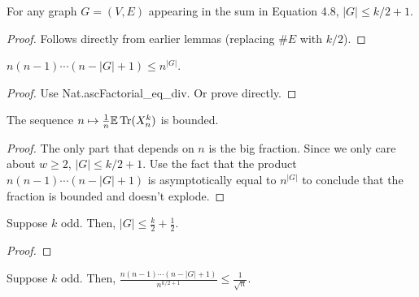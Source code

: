 \begin{lemma}
  \label{lemma:vertex_bound}
  \notready
  For any graph $G = (V, E)$ appearing in the sum in Equation 4.8, $|G| \le k/2 + 1$.
\end{lemma}

\begin{proof}
  \notready
  Follows directly from earlier lemmas (replacing $\#E$ with $k/2$).
\end{proof}



\begin{lemma}
  \label{lemma:asc_factorial_product}
  \notready
  $n(n-1)\cdots (n-|G|+1) \le n^{|G|}$.

\end{lemma}

\begin{proof}
  \notready
  Use Nat.ascFactorial\_eq\_div. Or prove directly.
\end{proof}



\begin{lemma}
  \label{lemma:bounded_map}
  \notready
  The sequence $n\mapsto \frac1n{\mathbb{E}}\operatorname{Tr}(X_n^k)$ is bounded.
\end{lemma}

\begin{proof}
  \notready
  The only part that depends on $n$ is the big fraction. Since we only care about $w \ge 2$, $|G| \le k/2 + 1$. Use the fact that the product $n(n-1)\cdots (n-|G|+1)$ is asymptotically equal to $n^{|G|}$ to conclude that the fraction is bounded and doesn't explode.
\end{proof}

\begin{lemma}
  \label{lemma:odd_vertex_bound}
  \notready
  Suppose $k$ odd. Then, $|G| \le \frac{k}{2} + \frac{1}{2}$.
\end{lemma}

\begin{proof}
  \notready
\end{proof}

\begin{lemma}
  \label{lemma:odd_ratio_bound}
  \notready
  Suppose $k$ odd. Then, $\frac{n(n-1)\cdots(n-|G|+1)}{n^{k/2+1}} \le \frac{1}{\sqrt{n}}$.
\end{lemma}

